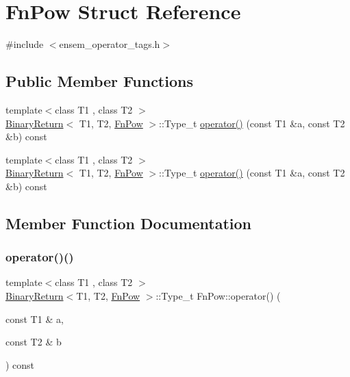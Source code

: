 \hypertarget{structFnPow}{}\section{Fn\+Pow Struct Reference}
\label{structFnPow}


{\ttfamily \#include $<$ensem\+\_\+operator\+\_\+tags.\+h$>$}

\subsection*{Public Member Functions}
\begin{DoxyCompactItemize}
\item 
{\footnotesize template$<$class T1 , class T2 $>$ }\\\mbox{\hyperlink{structBinaryReturn}{Binary\+Return}}$<$ T1, T2, \mbox{\hyperlink{structFnPow}{Fn\+Pow}} $>$\+::Type\+\_\+t \mbox{\hyperlink{structFnPow_ae45f2e7b97a332060329770959c524c7}{operator()}} (const T1 \&a, const T2 \&b) const
\item 
{\footnotesize template$<$class T1 , class T2 $>$ }\\\mbox{\hyperlink{structBinaryReturn}{Binary\+Return}}$<$ T1, T2, \mbox{\hyperlink{structFnPow}{Fn\+Pow}} $>$\+::Type\+\_\+t \mbox{\hyperlink{structFnPow_ae45f2e7b97a332060329770959c524c7}{operator()}} (const T1 \&a, const T2 \&b) const
\end{DoxyCompactItemize}


\subsection{Member Function Documentation}
\mbox{\label{structFnPow_ae45f2e7b97a332060329770959c524c7}} 
\subsubsection{\texorpdfstring{operator()()}{operator()()}\hspace{0.1cm}{\footnotesize\ttfamily [1/2]}}
{\footnotesize\ttfamily template$<$class T1 , class T2 $>$ \\
\mbox{\hyperlink{structBinaryReturn}{Binary\+Return}}$<$T1, T2, \mbox{\hyperlink{structFnPow}{Fn\+Pow}} $>$\+::Type\+\_\+t Fn\+Pow\+::operator() (\begin{DoxyParamCaption}\item[{const T1 \&}]{a,  }\item[{const T2 \&}]{b }\end{DoxyParamCaption}) const\hspace{0.3cm}{\ttfamily [inline]}}

